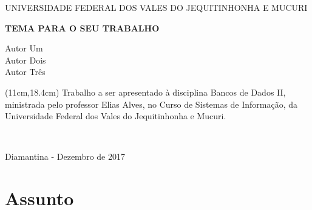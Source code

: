 \documentclass[12pt]{article}
\def\autores{Autor Um\\Autor Dois\\Autor Três}
\def\docente{Elias Alves}
\def\disciplina{Bancos de Dados II}
\def\tema{Tema para o seu trabalho}
\def\universidade{Universidade Federal dos Vales do Jequitinhonha e Mucuri}
\def\curso{Sistemas de Informação}
\def\cidade{Diamantina}
\begin{document}
\thispagestyle{empty}
\begin{center}
	\MakeUppercase{\universidade}
\end{center}
\vfill
\begin{center}
	\small\bfseries\MakeUppercase{\tema}
\end{center}
\vfill
\begin{flushright}
	\autores
\end{flushright}
\par
\begin{flushright}
	\begin{textblock*}{0.5\linewidth}(11cm,18.4cm)%
		\justifying Trabalho a ser apresentado à disciplina \disciplina, ministrada pelo professor \docente, no Curso de \curso, da \universidade.
	\end{textblock*} ~\\[1em]
\end{flushright}
\vfill
\vfill
\vfill
\begin{center}
	\cidade{ }- Dezembro de 2017 
\end{center}
\cleardoublepage


\section{Assunto}

\end{document}
